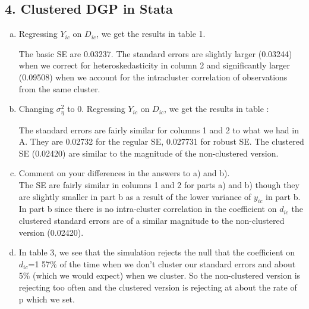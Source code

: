 \documentclass[11pt]{article}
\begin{document}
\subsection*{4. Clustered DGP in Stata}

\begin{enumerate}[a)]

	\item Regressing $Y_{ic}$ on $D_{ic}$, we get the results in table 1.
		 

	The basic SE are 0.03237. The standard errors are slightly larger (0.03244) when we correct for heteroskedasticity in column 2 and significantly larger (0.09508) when we account for the intracluster correlation of observations from the same cluster.

	\item Changing $\sigma^2_{\eta}$ to 0. Regressing $Y_{ic}$ on $D_{ic}$, we get the results in table :
		

	The standard errors are fairly similar for columns 1 and 2 to what we had in A. They are 0.02732 for the regular SE, 0.027731 for robust SE.  The clustered SE (0.02420) are similar to the magnitude of the non-clustered version.

	\item  Comment on your differences in the answers to a) and b). \\
The SE are fairly similar in columns 1 and 2 for parts a) and b) though they are slightly smaller in part b as a result of the lower variance of $y_{ic}$ in part b. In part b since there is no intra-cluster correlation in the coefficient on $d_{ic}$ the clustered standard errors are of a similar magnitude to the non-clustered version (0.02420). 

	\item In table 3, we see that the simulation rejects the null that the coefficient on $d_{ic}$=1 57\% of the time when we don't cluster our standard errors and about 5\% (which we would expect) when we cluster. So the non-clustered version is rejecting too often and the clustered version is rejecting at about the rate of p which we set.
		


\end{enumerate}
\end{document}
